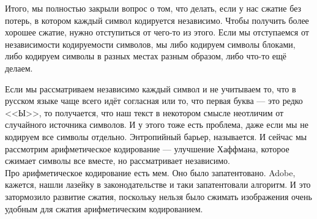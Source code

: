 \documentclass{article}
\begin{document}
\begin{itemize}
\begin{Proof}
        \end{Proof}
        \begin{Comment}
            Итого, мы полностью закрыли вопрос о том, что делать, если у нас сжатие без потерь, в котором каждый символ кодируется независимо. Чтобы получить более хорошее сжатие, нужно отступиться от чего-то из этого. Если мы отступаемся от независимости кодируемости символов, мы либо кодируем символы блоками, либо кодируем символы в разных местах разным образом, либо что-то ещё делаем.
        \end{Comment}
        \begin{Comment}
            Если мы рассматриваем независимо каждый символ и не учитываем то, что в русском языке чаще всего идёт согласная или то, что первая буква --- это редко <<Ы>>, то получается, что наш текст в некотором смысле неотличим от случайного источника символов. И у этого тоже есть проблема, даже если мы не кодируем все символы отдельно. Энтропийный барьер, называется. И сейчас мы рассмотрим арифметическое кодирование --- улучшение Хаффмана, которое сжимает символы все вместе, но рассматривает независимо.\\
            Про арифметическое кодирование есть мем. Оно было запатентовано. Adobe, кажется, нашли лазейку в законодательстве и таки запатентовали алгоритм. И это затормозило развитие сжатия, поскольку нельзя было сжимать изображения очень удобным для сжатия арифметическим кодированием.
        \end{Comment}
        \begin{Comment}

\end{Comment}
\end{itemize}
\end{document}
